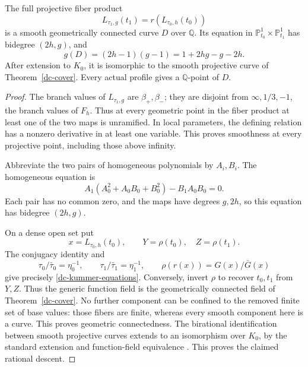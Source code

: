 \begin{theorem}\label{rd-descent}
The full projective fiber product
\begin{equation}\label{rd-fiber-product}
 L_{\tau_1,g}(t_1)=r(L_{\tau_0,h}(t_0))
\end{equation}
is a smooth geometrically connected curve $D$ over $\mathbb Q$.
Its equation in $\mathbb P^1_{t_0}\times\mathbb P^1_{t_1}$ has
bidegree $(2h,g)$, and
\begin{equation}\label{rd-genus}
 g(D)=(2h-1)(g-1)=1+2hg-g-2h.
\end{equation}
After extension to $K_0$, it is isomorphic to the smooth projective
curve of Theorem~\ref{dc-cover}. Every actual profile gives a
$\mathbb Q$-point of $D$.
\end{theorem}
\begin{proof}
The branch values of $L_{\tau_1,g}$ are $\beta_+,\beta_-$;
they are disjoint from $\infty,1/3,-1$, the branch values of $F_h$.
Thus at every geometric point in the fiber product at least one
of the two maps is unramified. In local parameters, the defining
relation has a nonzero derivative in at least one variable.
This proves smoothness at every projective point, including those
above infinity.

Abbreviate the two pairs of homogeneous polynomials by $A_i,B_i$.
The homogeneous equation is
\begin{equation}\label{rd-expanded-equation}
 A_1(A_0^2+A_0B_0+B_0^2)-B_1A_0B_0=0.
\end{equation}
Each pair has no common zero, and the maps have degrees $g,2h$,
so this equation has bidegree $(2h,g)$.

On a dense open set put
\[
 x=L_{\tau_0,h}(t_0),\qquad Y=\rho(t_0),\quad Z=\rho(t_1).
\]
The conjugacy identity and
\[
 \tau_0/\bar\tau_0=\eta_0^{-1},\qquad
 \tau_1/\bar\tau_1=\eta_1^{-1},\qquad
 \rho(r(x))=G(x)/\bar G(x)
\]
give precisely \eqref{dc-kummer-equations}. Conversely, invert
$\rho$ to recover $t_0,t_1$ from $Y,Z$. Thus the generic
function field is the geometrically connected field of
Theorem~\ref{dc-cover}. No further component can be confined to
the removed finite set of base values: those fibers are finite,
whereas every smooth component here is a curve. This proves
geometric connectedness. The birational identification between
smooth projective curves extends to an isomorphism over $K_0$,
by the standard extension and function-field equivalence
\cite[Lemma~53.2.2 and Theorem~53.2.6]{StacksCurves2026}.
This proves the claimed rational descent.


\end{proof}
